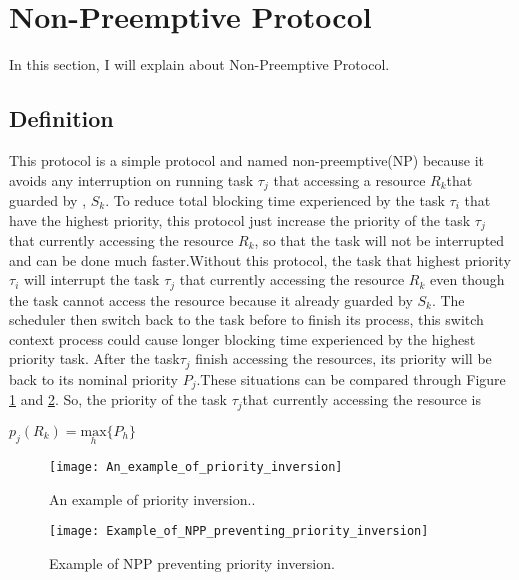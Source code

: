 \section{Non-Preemptive Protocol}

In this section, I will explain about Non-Preemptive Protocol.

\subsection{Definition}

This protocol is a simple protocol and named non-preemptive(NP) because it avoids any interruption on running task $\tau_{j}$ that accessing a resource $ R_{k} $that guarded by , $ S_{k} $. To reduce total blocking time experienced by the task $\tau_{i}$ that have the highest priority, this protocol just increase the priority of the task $\tau_{j}$ that currently accessing the resource $ R_{k} $, so that the task will not be interrupted and can be done much faster.Without this protocol, the task that highest priority $\tau_{i}$ will interrupt the task $\tau_{j}$ that currently accessing the resource $ R_{k} $ even though the task cannot access the resource because it already guarded by $ S_{k} $. The scheduler then switch back to the task before to finish its process, this switch context process could cause longer blocking time experienced by the highest priority task. After the task$\tau_{j}$ finish accessing the resources, its priority will be back to its nominal priority $ P_{j} $.These situations can be compared through Figure \ref{fig:An_example_of_priority_inversion} and \ref{fig:Example_of_NPP_preventing_priority_inversion}. So, the priority of the task $\tau_{j}$that currently accessing the resource is 

\begin{center}
$p_{j}(R_{k})=\underset{h}{\mathrm{max}} \{P_{h}\}  $ \cite{b5}

\end{center}

\begin{figure}[ht]
    \centering
    \texttt{[image: An\_example\_of\_priority\_inversion]}
    \caption{An example of priority inversion.. \cite{b5}}
    \label{fig:An_example_of_priority_inversion}
\end{figure}

\begin{figure}[ht]
    \centering
    \texttt{[image: Example\_of\_NPP\_preventing\_priority\_inversion]}
    \caption{Example of NPP preventing priority inversion. \cite{b5}}
    \label{fig:Example_of_NPP_preventing_priority_inversion}
\end{figure}


